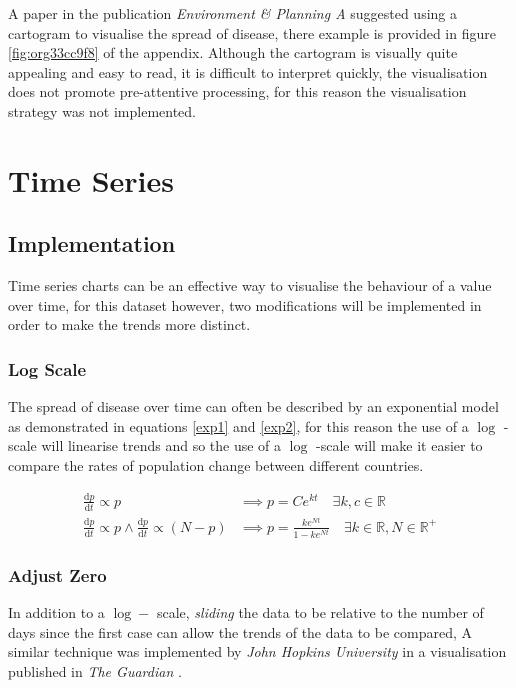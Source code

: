 \documentclass[11pt]{article}
\begin{document}
A paper in the publication \emph{Environment \& Planning A} suggested using a
cartogram to visualise the spread of disease, there example is provided in
figure \ref{fig:org33cc9f8} of the appendix. \cite{gao2020} Although the cartogram is visually
quite appealing and easy to read, it is difficult to interpret quickly, the
visualisation does not promote pre-attentive processing, for this reason the
visualisation strategy was not implemented.

\section{Time Series}
\label{sec:org4c934f0}
\subsection{Implementation}
\label{sec:org9bf18cf}
Time series charts can be an effective way to visualise the behaviour of a value
over time, for this dataset however, two modifications will be implemented in
order to make the trends more distinct.

\subsubsection{Log Scale}
\label{sec:orgd308ab2}
The spread of disease over time can often be described by an exponential model as
demonstrated in equations \eqref{exp1} and \eqref{exp2}, for this reason the use of
a \(\log\) -scale will linearise trends and so the use of a \(\log\) -scale will make
it easier to compare the rates of population change between different countries.



\begin{align}
  \frac{\mathrm{d} p}{\mathrm{d} t} \propto p &\implies p = Ce^{kt} \quad \exists k,c \in \mathbb{R} \label{exp1} \\
  \frac{\mathrm{d} p}{\mathrm{d} t} \propto p \wedge    \frac{\mathrm{d} p}{\mathrm{d} t} \propto (N-p) &\implies p = \frac{ke^{Nt}}{1-ke^{Nt}} \quad \exists k \in \mathbb{R}, N \in \mathbb{R^+} \label{exp2}
\end{align}

\subsubsection{Adjust Zero}
\label{sec:org4d3d5e3}
In addition to a \(\log-\) scale, \emph{sliding} the data to be relative to the number
of days since the first case can allow the trends of the data to be compared,
A similar technique was implemented by \emph{John Hopkins University} in a visualisation published
in \emph{The Guardian} \cite{gutierrez2020}. \label{org6579817}
\end{document}

